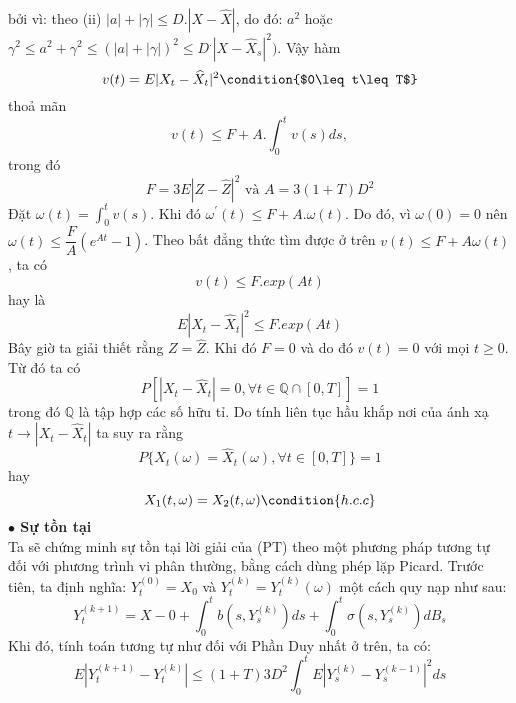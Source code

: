 \documentclass[a4paper]{article}
\numberwithin{equation}{section}
\begin{document}
bởi vì: theo (ii) $|a|+|\gamma|\leq D.|X-\widehat{X}|$, do đó: $a^2$ hoặc $\gamma^2\leq a^2+\gamma^2\leq (|a|+|\gamma|)^2\leq D^.|X-\widehat{X}_s|^2)$. Vậy hàm
\begin{equation*}
	v(t)=E|X_t-\widehat{X}_t|^2\condition{$0\leq t\leq T$}
\end{equation*}
thoả mãn
\begin{equation*}
	v(t)\leq F+A.\int_0^tv(s)ds,
\end{equation*}
trong đó 
\begin{equation*}
	F=3E|Z-\widehat{Z}|^2\text{ và }A=3(1+T)D^2
\end{equation*}
Đặt $\omega(t)=\int_0^tv(s)$. Khi đó $\omega^'(t)\leq F+A.\omega(t)$. Do đó, vì $\omega(0)=0$ nên $\omega(t)\leq\dfrac{F}{A}(e^{At}-1)$. Theo bất đẳng thức tìm được ở trên $v(t)\leq F+A\omega(t)$, ta có
\begin{equation*}
	v(t)\leq F.exp(At)
\end{equation*}
hay là
\begin{equation*}
	E|X_t-\widehat{X}_t|^2\leq F.exp(At)
\end{equation*}
Bây giờ ta giải thiết rằng $Z=\widehat{Z}$. Khi đó $F=0$ và do đó $v(t)=0$ với mọi $t\geq 0$. Từ đó ta có
\begin{equation*}
	P[|X_t-\widehat{X}_t|=0,\forall t\in \mathbb{Q}\cap[0,T]]=1
\end{equation*}
trong đó $\mathbb{Q}$ là tập hợp các số hữu tỉ. Do tính liên tục hầu khắp nơi của ánh xạ $t\rightarrow|X_t-\widehat{X}_t|$ ta suy ra rằng
\begin{equation*}
	P\{X_t(\omega)=\widehat{X}_t(\omega),\forall t\in[0,T]\}=1
\end{equation*}
hay
\begin{equation*}
	X_1(t,\omega)=X_2(t,\omega)\condition{h.c.c}
\end{equation*}
\textbf{$\bullet$ Sự tồn tại}\\
Ta sẽ chứng minh sự tồn tại lời giải của (PT) theo một phương pháp tương tự đối với phương trình vi phân thường, bằng cách dùng phép lặp Picard. Trước tiên, ta định nghĩa: $Y_t^{(0)}=X_0$ và $Y_t^{(k)}=Y_t^{(k)}(\omega)$ một cách quy nạp như sau:
\begin{equation}\label{eq:stt1}
	Y_t^{(k+1)}=X-0+\int_0^tb(s,Y_s^{(k)})ds+\int_0^t\sigma(s,Y_s^{(k)})dB_s
\end{equation}
Khi đó, tính toán tương tự như đối với Phần Duy nhất ở trên, ta có:
\begin{equation}\label{eq:stt2}
	E|Y_t^{(k+1)}-Y_t^{(k)}|\leq(1+T)3D^2\int_0^tE|Y^{(k)}_s-Y^{(k-1)}_s|^2ds
\end{equation}
\end{document}

